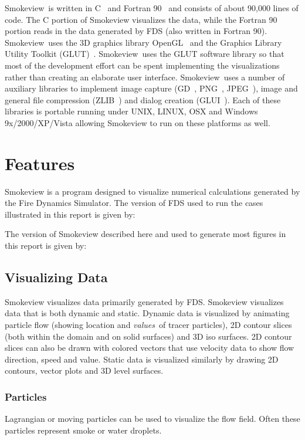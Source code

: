 \documentclass[11pt,twoside]{book}
\newcommand{\Smokeview}{{Smokeview}}
\newcommand{\smokeview}{{Smokeview}}
\begin{document}
\Smokeview\ is written in C~\cite{C:book} and Fortran 90~\cite{Fortran:book} and consists of about
90,000 lines of code. The C portion of Smokeview visualizes the
data, while the Fortran 90 portion reads in the data generated by
FDS (also written in Fortran 90). \smokeview\ uses the 3D graphics
library OpenGL~\cite{OpenGLRed} and the Graphics Library Utility
Toolkit (GLUT)~\cite{OpenGLGlut}. \Smokeview\ uses the GLUT
software library so that most of the development effort can be
spent implementing the visualizations rather than creating an
elaborate user interface.  \Smokeview\ uses a number of auxiliary
libraries to implement image capture (GD~\cite{BOUTELL,GDLIB},
PNG~\cite{PNGLIB}, JPEG~\cite{JPEGLIB}), image and general file
compression (ZLIB~\cite{ZLIB}) and dialog creation
(GLUI~\cite{GLUILIB}). Each of these libraries is portable running
under UNIX, LINUX, OSX and Windows 9x/2000/XP/Vista allowing Smokeview to run
on these platforms as well.

\section{Features}

Smokeview is a program designed to visualize numerical
calculations generated by the Fire Dynamics Simulator.
The version of FDS used to run the cases illustrated  in this report
is given by:
{

}
The version of Smokeview described here and used
to generate most figures in this report is given by:
{

}


\subsection{Visualizing Data}

Smokeview visualizes data primarily generated by FDS.
Smokeview visualizes data that is both dynamic and static.  Dynamic
data is visualized by animating particle flow (showing
location and {\em values}\ of tracer particles), 2D contour
slices (both within the domain and on solid surfaces) and
3D iso surfaces.  2D contour slices can also be drawn
with colored vectors that use velocity data to show flow
direction, speed and value. Static data is visualized
similarly by drawing 2D contours, vector plots and 3D level
surfaces.

\subsubsection{Particles} Lagrangian or moving particles can be
used to visualize the flow field. Often these particles represent
smoke or water droplets.
\end{document}
